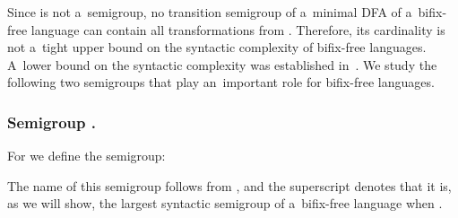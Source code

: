 \documentclass{amsart}
\begin{document}
Since  is not a~semigroup, no transition semigroup of a~minimal DFA of a~bifix-free language can contain all transformations from .
Therefore, its cardinality is not a~tight upper bound on the syntactic complexity of bifix-free languages.
A~lower bound on the syntactic complexity was established in~\cite{BLY12}.
We study the following two semigroups that play an~important role for bifix-free languages.

\subsubsection{Semigroup .}

For  we define the semigroup:

The name of this semigroup follows from \cite{BLY12}, and the superscript denotes that it is, as we will show, the largest syntactic semigroup of a~bifix-free language when .
\end{document}
